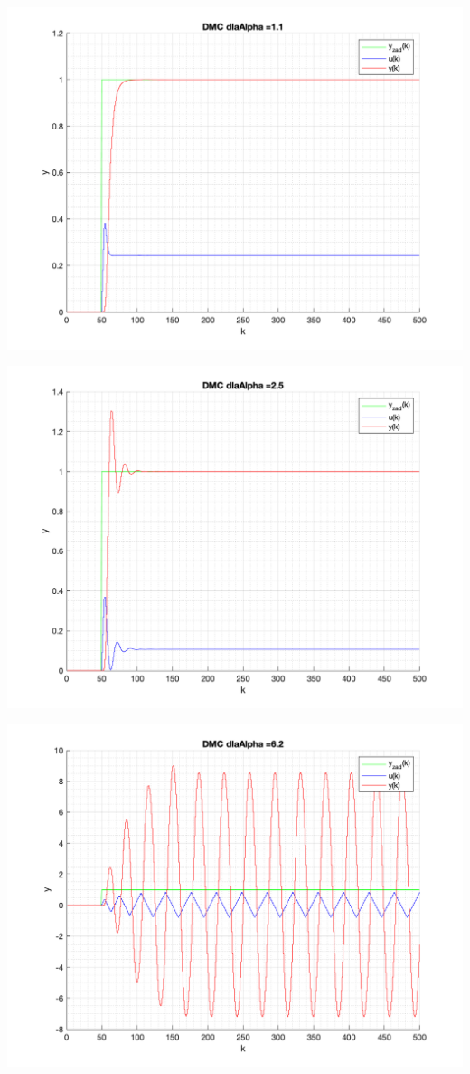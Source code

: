 \documentclass[a4paper, 11pt]{article}
\begin{document}
\begin{enumerate}
 \includegraphics[width=\linewidth]{./ModelsDodatkowe_Alpha/P4_DMC_Alpha_1_1_png.png} 
 
 \includegraphics[width=\linewidth]{./ModelsDodatkowe_Alpha/P4_DMC_Alpha_2_5_png.png} 
 
 \includegraphics[width=\linewidth]{./ModelsDodatkowe_Alpha/P4_DMC_Alpha_6_2_png.png} 
 

\end{enumerate}
\end{document}
